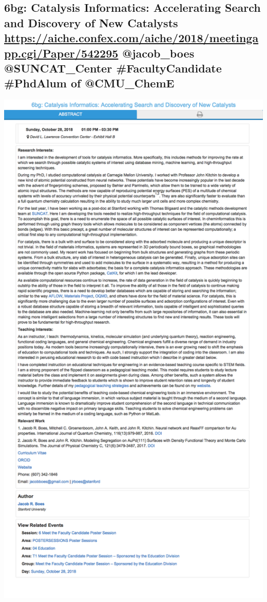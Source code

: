 \documentclass[11pt]{article}
\begin{document}
\subsection{6bg: Catalysis Informatics: Accelerating Search and Discovery of New Catalysts \url{https://aiche.confex.com/aiche/2018/meetingapp.cgi/Paper/542295} @jacob\_boes @SUNCAT\_Center \#FacultyCandidate \#PhdAlum of @CMU\_ChemE}
\label{sec:org26238c0}
\begin{center}
\includegraphics[width=.9\linewidth]{./542295.png}
\end{center}
\end{document}
